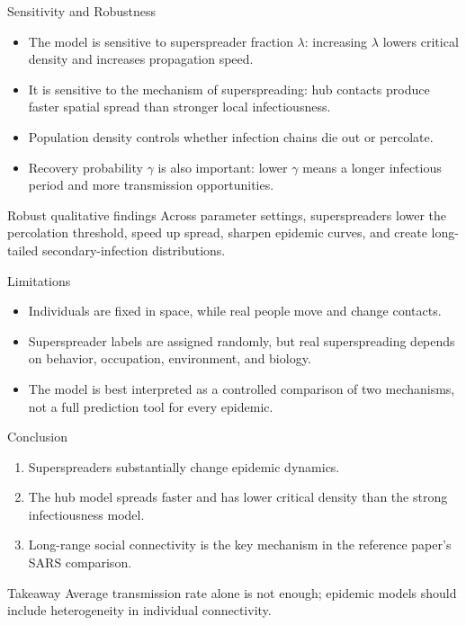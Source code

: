 \documentclass[aspectratio=169,10pt]{beamer}
\begin{document}
\begin{frame}{Sensitivity and Robustness}
  \begin{itemize}
    \item The model is sensitive to superspreader fraction $\lambda$: increasing $\lambda$ lowers critical density and increases propagation speed.
    \item It is sensitive to the mechanism of superspreading: hub contacts produce faster spatial spread than stronger local infectiousness.
    \item Population density controls whether infection chains die out or percolate.
    \item Recovery probability $\gamma$ is also important: lower $\gamma$ means a longer infectious period and more transmission opportunities.
  \end{itemize}
  \begin{block}{Robust qualitative findings}
    Across parameter settings, superspreaders lower the percolation threshold, speed up spread, sharpen epidemic curves, and create long-tailed secondary-infection distributions.
  \end{block}
\end{frame}

\begin{frame}{Limitations}
  \begin{itemize}
    \item Individuals are fixed in space, while real people move and change contacts.
    \item Superspreader labels are assigned randomly, but real superspreading depends on behavior, occupation, environment, and biology.
    \item The model is best interpreted as a controlled comparison of two mechanisms, not a full prediction tool for every epidemic.
  \end{itemize}
\end{frame}

\begin{frame}{Conclusion}
  \begin{enumerate}
    \item Superspreaders substantially change epidemic dynamics.
    \item The hub model spreads faster and has lower critical density than the strong infectiousness model.
    \item Long-range social connectivity is the key mechanism in the reference paper's SARS comparison.
  \end{enumerate}
  \vspace{0.35cm}
  \begin{block}{Takeaway}
    Average transmission rate alone is not enough; epidemic models should include heterogeneity in individual connectivity.
  \end{block}
\end{frame}
\end{document}
